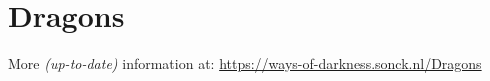 \section{Dragons}
More \textit{(up-to-date)} information at: \url{https://ways-of-darkness.sonck.nl/Dragons}\newline
